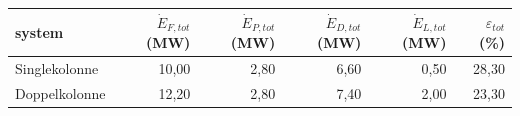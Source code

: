\begin{tabular}{lrrrrr}
\hline
system & $\dot{E}_{F,tot}$ (MW) & $\dot{E}_{P,tot}$ (MW) & $\dot{E}_{D,tot}$ (MW) & $\dot{E}_{L,tot}$ (MW) & $\varepsilon_{tot}$ (\%) \\
\hline
Singlekolonne & 10,00 & 2,80 & 6,60 & 0,50 & 28,30 \\
Doppelkolonne & 12,20 & 2,80 & 7,40 & 2,00 & 23,30 \\
\hline
\end{tabular}
